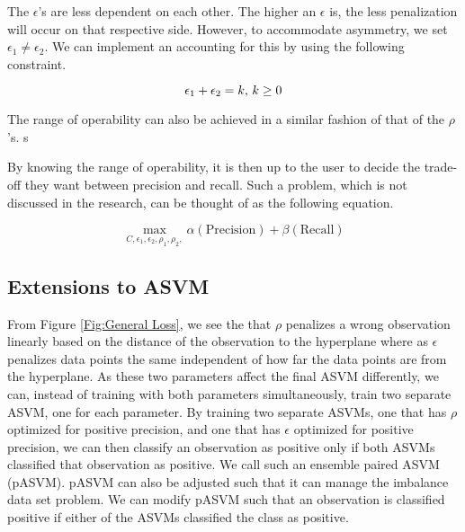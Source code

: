 \documentclass[twoside,11pt]{article}
\begin{document}
The $\epsilon$'s are less dependent on each other. The higher an $\epsilon$ is, the less penalization will occur on that respective side. However, to accommodate asymmetry, we set $\epsilon_1 \neq \epsilon_2$. We can implement an accounting for this by using the following constraint.

\begin{equation}\label{epsilon constraint}
\epsilon_1 + \epsilon_2=k \\
\text{, } k \geq 0
\end{equation}

The range of operability can also be achieved in a similar fashion of that of the $\rho$'s. s

By knowing the range of operability, it is then up to the user to decide the trade-off they want between precision and recall. Such a problem, which is not discussed in the research, can be thought of as the following equation. 

\begin{equation}\label{eqn:asymmetryutility}
 \max_{C,\epsilon_1,\epsilon_2,\rho_1,\rho_2,} \alpha(\text{Precision}) + \beta(\text{Recall})
 \end{equation}


\subsection{Extensions to ASVM}
From Figure \ref{Fig:General Loss}, we see the that $\rho$ penalizes a wrong observation linearly based on the distance of the observation to the hyperplane where as $\epsilon$ penalizes data points the same independent of how far the data points are from the hyperplane. As these two parameters affect the final ASVM differently, we can, instead of training with both parameters simultaneously, train two separate ASVM, one for each parameter. By training two separate ASVMs, one that has $\rho$ optimized for positive precision, and one that has $\epsilon$ optimized for positive precision, we can then classify an observation as positive only if both ASVMs classified that observation as positive. We call such an ensemble paired ASVM (pASVM). pASVM can also be adjusted such that it can manage the imbalance data set problem. We can modify pASVM such that an observation is classified positive if either of the ASVMs classified the class as positive. 
\end{document}
